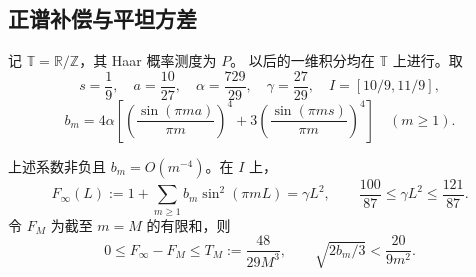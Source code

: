 \subsection{正谱补偿与平坦方差}
记 $\mathbb T=\mathbb R/\mathbb Z$，其 Haar 概率测度为 $P$。
以后的一维积分均在 $\mathbb T$ 上进行。取
\[
 s=\frac19,\quad a=\frac{10}{27},\quad\alpha=\frac{729}{29},
 \quad\gamma=\frac{27}{29},\quad I=[10/9,11/9],
\]
\[
 b_m=4\alpha\left[\left(\frac{\sin(\pi ma)}{\pi m}\right)^4
 +3\left(\frac{\sin(\pi ms)}{\pi m}\right)^4\right]\quad(m\ge1).
\]
\begin{lemma}[正谱恒等式]\label{lem:paperplateau}
上述系数非负且 $b_m=O(m^{-4})$。在 $I$ 上，
\[
 F_\infty(L):=1+\sum_{m\ge1}b_m\sin^2(\pi mL)=\gamma L^2,
 \qquad \frac{100}{87}\le\gamma L^2\le\frac{121}{87}.
\]
令 $F_M$ 为截至 $m=M$ 的有限和，则
\[
 0\le F_\infty-F_M\le T_M:=\frac{48}{29M^3},\qquad
 \sqrt{2b_m/3}<\frac{20}{9m^2}.
\]
\end{lemma}
